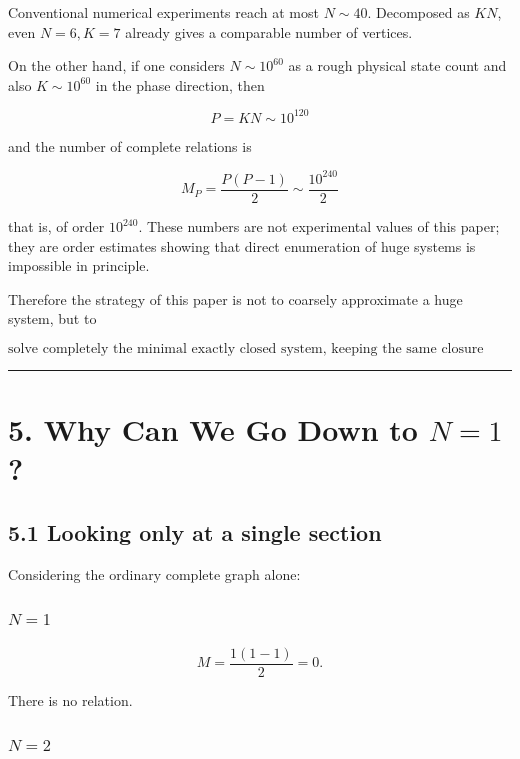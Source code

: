 \documentclass[
  a4paper,
]{article}
\begin{document}
Conventional numerical experiments reach at most \(N\sim40\). Decomposed
as \(KN\), even \(N=6, K=7\) already gives a comparable number of
vertices.

On the other hand, if one considers \(N\sim10^{60}\) as a rough physical
state count and also \(K\sim10^{60}\) in the phase direction, then

\[
P=KN\sim10^{120}
\]

and the number of complete relations is

\[
M_P
=
\frac{P(P-1)}{2}
\sim
\frac{10^{240}}{2}
\]

that is, of order \(10^{240}\). These numbers are not experimental
values of this paper; they are order estimates showing that direct
enumeration of huge systems is impossible in principle.

Therefore the strategy of this paper is not to coarsely approximate a
huge system, but to

\[
\boxed{
\text{solve completely the minimal exactly closed system, keeping the same closure axiom and complete relational structure}
}
\]

\begin{center}\rule{0.5\linewidth}{0.5pt}\end{center}

\section{\texorpdfstring{5. Why Can We Go Down to
\(N=1\)?}{5. Why Can We Go Down to N=1?}}\label{why-can-we-go-down-to-n1}

\subsection{5.1 Looking only at a single
section}\label{looking-only-at-a-single-section}

Considering the ordinary complete graph alone:

\subsubsection{\texorpdfstring{\(N=1\)}{N=1}}\label{n1}

\[
M
=
\frac{1(1-1)}{2}
=0.
\]

There is no relation.

\subsubsection{\texorpdfstring{\(N=2\)}{N=2}}\label{n2}
\end{document}
